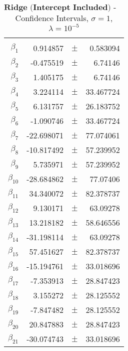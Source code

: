 \documentclass[...,numrefs]{wiley-article}
\begin{document}
\begin{table}[h]
    \centering
    \caption{$\textbf{Ridge (Intercept Included) - Franke Function:}$ Confidence Intervals, $\sigma = 1$, $\lambda = 10^{-5}$}
    \begin{tabular}{rrrr}
    \hline
    \\
    $\beta_{1}$ & 0.914857 & $\pm$ & 0.583094 \\
    $\beta_{2}$ & -0.475519 & $\pm$ & 6.74146 \\
    $\beta_{3}$ & 1.405175 & $\pm$ & 6.74146 \\
    $\beta_{4}$ & 3.224114 & $\pm$ & 33.467724 \\
    $\beta_{5}$ & 6.131757 & $\pm$ & 26.183752 \\
    $\beta_{6}$ & -1.090746 & $\pm$ & 33.467724 \\
    $\beta_{7}$ & -22.698071 & $\pm$ & 77.074061 \\
    $\beta_{8}$ & -10.817492 & $\pm$ & 57.239952 \\
    $\beta_{9}$ & 5.735971 & $\pm$ & 57.239952 \\
    $\beta_{10}$ & -28.684862 & $\pm$ & 77.07406 \\
    $\beta_{11}$ & 34.340072 & $\pm$ & 82.378737 \\
    $\beta_{12}$ & 9.130171 & $\pm$ & 63.09278 \\
    $\beta_{13}$ & 13.218182 & $\pm$ & 58.646556 \\
    $\beta_{14}$ & -31.198114 & $\pm$ & 63.09278 \\
    $\beta_{15}$ & 57.451627 & $\pm$ & 82.378737 \\
    $\beta_{16}$ & -15.194761 & $\pm$ & 33.018696 \\
    $\beta_{17}$ & -7.353913 & $\pm$ & 28.847423 \\
    $\beta_{18}$ & 3.155272 & $\pm$ & 28.125552 \\
    $\beta_{19}$ & -7.847482 & $\pm$ & 28.125552 \\
    $\beta_{20}$ & 20.847883 & $\pm$ & 28.847423 \\
    $\beta_{21}$ & -30.074743 & $\pm$ & 33.018696 \\
    \hline
    \end{tabular}

    \label{tab:my_label}
\end{table}
\end{document}
